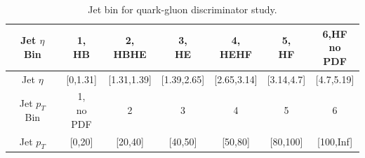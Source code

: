 \begin{table}[htbp]
\fontsize{10 pt}{1.2 em}
\selectfont
\begin{centering}
\caption{\label{tab:c4ttqgl} Jet bin for quark-gluon discriminator study.}
\hspace*{-4ex}
\begin{tabular}{|c|c|c|c|c|c|c|}
\hline
Jet $\eta$ Bin  & \specialcell{1,\\HB} & \specialcell{2,\\HBHE} & \specialcell{3,\\HE} & \specialcell{4,\\HEHF} & \specialcell{5,\\HF} & \specialcell{6,HF \\no PDF} \\
\hline
Jet $\eta$      & [0,1.31] & [1.31,1.39] & [1.39,2.65] & [2.65,3.14] & [3.14,4.7] & [4.7,5.19] \\
\hline
Jet $p_{T}$ Bin & \specialcell{1,\\no PDF} & 2 & 3 & 4 & 5 & 6 \\
\hline
Jet $p_{T}$     & [0,20] & [20,40] & [40,50] & [50,80] & [80,100] & [100,Inf] \\
\hline
\end{tabular}
\par\end{centering}
\end{table}

